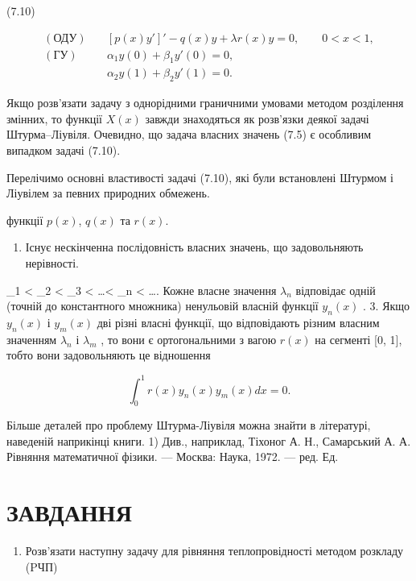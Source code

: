 \documentclass[
  ukrainian,
]{article}
\providecommand{\tightlist}{%
  \setlength{\itemsep}{0pt}\setlength{\parskip}{0pt}}
\begin{document}
(7.10)

\[
\begin{aligned}
(\text{ОДУ})\quad & [p(x)y']' - q(x)y + \lambda r(x)y = 0,\qquad 0<x<1,\\
(\text{ГУ})\quad & \alpha_1 y(0) + \beta_1 y'(0)=0,\\
& \alpha_2 y(1) + \beta_2 y'(1)=0.
\end{aligned}
\]

Якщо розв'язати задачу з однорідними граничними умовами методом
розділення змінних, то функції \(X(x)\) завжди знаходяться як розв'язки
деякої задачі Штурма--Ліувіля. Очевидно, що задача власних значень (7.5)
є особливим випадком задачі (7.10).

Перелічимо основні властивості задачі (7.10), які були встановлені
Штурмом і Ліувілем за певних природних обмежень.

функції \(p(x)\), \(q(x)\) та \(r(x)\).

\begin{enumerate}
\def\labelenumi{\arabic{enumi}.}
\tightlist
\item
  Існує нескінченна послідовність власних значень, що задовольняють
  нерівності.
\end{enumerate}

\lambda\_1 \textless{} \lambda\_2 \textless{} \lambda\_3 \textless{}
\ldots \textless{} \lambda\_n \textless{} \ldots \to {}. Кожне власне значення \(\lambda_n\) відповідає одній (точній до
константного множника) ненульовій власній функції \(y_n(x)\) . 3. Якщо
\(y_n(x)\) і \(y_m(x)\) дві різні власні функції, що відповідають різним
власним значенням \(\lambda_n\) і \(\lambda_m\) , то вони є
ортогональними з вагою \(r(x)\) на сегменті {[}0, 1{]}, тобто вони
задовольняють це відношення

\[
\int_{0}^{1} r(x) y_{n}(x) y_{m}(x) dx = 0.
\]

Більше деталей про проблему Штурма-Ліувіля можна знайти в літературі,
наведеній наприкінці книги. 1) Див., наприклад, Тіхоног А. Н.,
Самарський А. А. Рівняння математичної фізики. --- Москва: Наука, 1972.
--- ред. Ед.

\section{ЗАВДАННЯ}\label{ux437ux430ux432ux434ux430ux43dux43dux44f-6}

\begin{enumerate}
\def\labelenumi{\arabic{enumi}.}
\tightlist
\item
  Розв'язати наступну задачу для рівняння теплопровідності методом
  розкладу (PЧП)
\end{enumerate}
\end{document}
